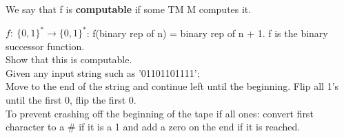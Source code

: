 \begin{definition}
  We say that f is \textbf{computable} if some TM M computes it.
\end{definition}
\begin{example}
  $f: \: \{0, 1\}^* \to \{0, 1\}^*$: f(binary rep of n) = binary rep of n + 1. f is the binary successor function.
  \\ 
  Show that this is computable.
  \\
  Given any input string such as '01101101111':
  \\
  Move to the end of the string and continue left until the beginning. Flip all 1's until the first 0, flip the first 0.
  \\
  To prevent crashing off the beginning of the tape if all ones: convert first character to a \# if it is a 1 and add a zero on the end if it is reached.
\end{example}